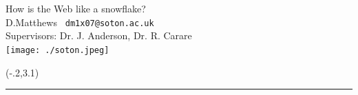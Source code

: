 \documentclass[a1,portrait]{a0poster}
\begin{document}





\begin{minipage}[c][9cm][c]{\textwidth}
  \begin{center}
    {\sc \Huge How is the Web like a snowflake?}\\[10mm]
    {\large D.Matthews \texttt{ dm1x07@soton.ac.uk}\\[7.5mm]
     \large Supervisors: Dr. J. Anderson, Dr. R. Carare\\[7.5mm]}  
     \texttt{[image: ./soton.jpeg]}   
     \end{center}
\end{minipage}


\begin{textblock}{17.4}(-.2,3.1)
\rule{17.4\TPHorizModule}{1.8mm}
\end{textblock}

\sloppy


\end{document}
